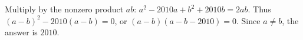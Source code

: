 Multiply by the nonzero product $ab$: $a^2-2010a+b^2+2010b=2ab$. Thus $(a-b)^2-2010(a-b)=0$, or $(a-b)(a-b-2010)=0$. Since $a\ne b$, the answer is $\boxed{2010}$.
